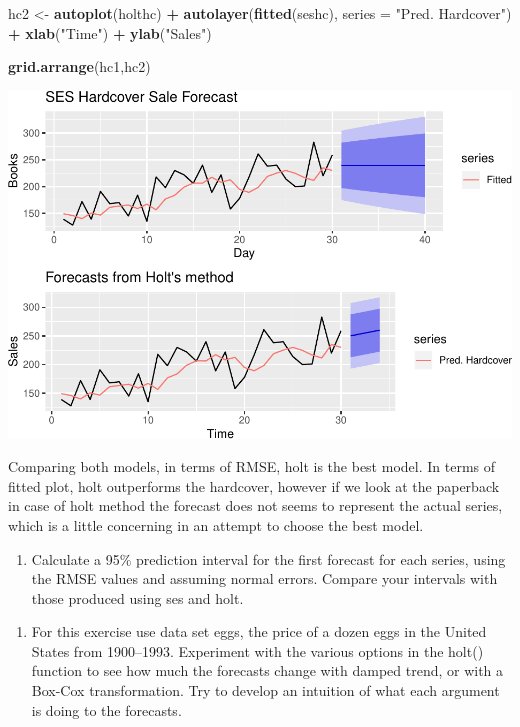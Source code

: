 \documentclass[]{article}
\newenvironment{Shaded}{\begin{snugshade}}{\end{snugshade}}
\newcommand{\KeywordTok}[1]{\textcolor[rgb]{0.13,0.29,0.53}{\textbf{#1}}}
\newcommand{\DataTypeTok}[1]{\textcolor[rgb]{0.13,0.29,0.53}{#1}}
\newcommand{\StringTok}[1]{\textcolor[rgb]{0.31,0.60,0.02}{#1}}
\newcommand{\OperatorTok}[1]{\textcolor[rgb]{0.81,0.36,0.00}{\textbf{#1}}}
\newcommand{\NormalTok}[1]{#1}
\providecommand{\tightlist}{%
  \setlength{\itemsep}{0pt}\setlength{\parskip}{0pt}}
\begin{document}
\begin{Shaded}
\begin{Highlighting}[]
\NormalTok{hc2 <-}\StringTok{ }\KeywordTok{autoplot}\NormalTok{(holthc) }\OperatorTok{+}
\StringTok{  }\KeywordTok{autolayer}\NormalTok{(}\KeywordTok{fitted}\NormalTok{(seshc), }\DataTypeTok{series =} \StringTok{"Pred. Hardcover"}\NormalTok{) }\OperatorTok{+}
\StringTok{  }\KeywordTok{xlab}\NormalTok{(}\StringTok{"Time"}\NormalTok{) }\OperatorTok{+}\StringTok{ }\KeywordTok{ylab}\NormalTok{(}\StringTok{"Sales"}\NormalTok{)}

\KeywordTok{grid.arrange}\NormalTok{(hc1,hc2)}
\end{Highlighting}
\end{Shaded}

\includegraphics{Hw4_files/figure-latex/unnamed-chunk-14-1.pdf}

Comparing both models, in terms of RMSE, holt is the best model. In
terms of fitted plot, holt outperforms the hardcover, however if we look
at the paperback in case of holt method the forecast does not seems to
represent the actual series, which is a little concerning in an attempt
to choose the best model.

\begin{enumerate}
\def\labelenumi{\alph{enumi})}
\setcounter{enumi}{3}
\tightlist
\item
  Calculate a 95\% prediction interval for the first forecast for each
  series, using the RMSE values and assuming normal errors. Compare your
  intervals with those produced using ses and holt.
\end{enumerate}

\begin{enumerate}
\def\labelenumi{\arabic{enumi}.}
\setcounter{enumi}{6}
\tightlist
\item
  For this exercise use data set eggs, the price of a dozen eggs in the
  United States from 1900--1993. Experiment with the various options in
  the holt() function to see how much the forecasts change with damped
  trend, or with a Box-Cox transformation. Try to develop an intuition
  of what each argument is doing to the forecasts.
\end{enumerate}
\end{document}
